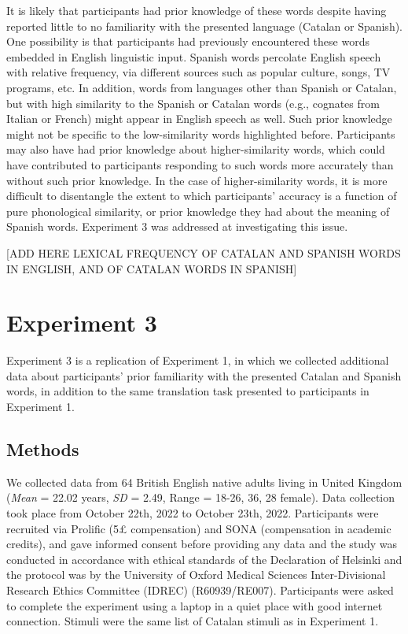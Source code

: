 \documentclass[
]{article}
\begin{document}
It is likely that participants had prior knowledge of these words
despite having reported little to no familiarity with the presented
language (Catalan or Spanish). One possibility is that participants had
previously encountered these words embedded in English linguistic input.
Spanish words percolate English speech with relative frequency, via
different sources such as popular culture, songs, TV programs, etc. In
addition, words from languages other than Spanish or Catalan, but with
high similarity to the Spanish or Catalan words (e.g., cognates from
Italian or French) might appear in English speech as well. Such prior
knowledge might not be specific to the low-similarity words highlighted
before. Participants may also have had prior knowledge about
higher-similarity words, which could have contributed to participants
responding to such words more accurately than without such prior
knowledge. In the case of higher-similarity words, it is more difficult
to disentangle the extent to which participants' accuracy is a function
of pure phonological similarity, or prior knowledge they had about the
meaning of Spanish words. Experiment 3 was addressed at investigating
this issue.

{[}ADD HERE LEXICAL FREQUENCY OF CATALAN AND SPANISH WORDS IN ENGLISH,
AND OF CATALAN WORDS IN SPANISH{]}

\section{Experiment 3}\label{experiment-3}

Experiment 3 is a replication of Experiment 1, in which we collected
additional data about participants' prior familiarity with the presented
Catalan and Spanish words, in addition to the same translation task
presented to participants in Experiment 1.

\subsection{Methods}\label{methods-2}

We collected data from 64 British English native adults living in United
Kingdom (\emph{Mean} = 22.02 years, \emph{SD} = 2.49, Range = 18-26, 36,
28 female). Data collection took place from October 22th, 2022 to
October 23th, 2022. Participants were recruited via Prolific (5£
compensation) and SONA (compensation in academic credits), and gave
informed consent before providing any data and the study was conducted
in accordance with ethical standards of the Declaration of Helsinki and
the protocol was by the University of Oxford Medical Sciences
Inter-Divisional Research Ethics Committee (IDREC) (R60939/RE007).
Participants were asked to complete the experiment using a laptop in a
quiet place with good internet connection. Stimuli were the same list of
Catalan stimuli as in Experiment 1.
\end{document}
